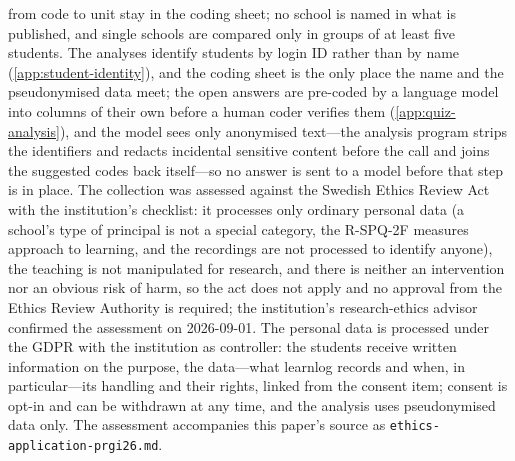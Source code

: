 from code to unit stay in the coding sheet; no school is named in what is
published, and single schools are compared only in groups of at least
five students.
The analyses identify students by login ID rather than by name
(\cref{app:student-identity}), and the coding sheet is the only place the
name and the pseudonymised data meet; the open answers are pre-coded by a
language model into columns of their own before a human coder verifies
them (\cref{app:quiz-analysis}), and the model sees only anonymised
text---the analysis program strips the identifiers and redacts
incidental sensitive content before the call and joins the suggested
codes back itself---so no answer is sent to a model before that step is
in place.
The collection was assessed against the Swedish Ethics Review Act
\autocite{Etikprovningslagen} with the institution's checklist: it
processes only ordinary personal data (a school's type of principal is
not a special category, the R-SPQ-2F measures approach to learning, and
the recordings are not processed to identify anyone), the teaching is
not manipulated for research, and there is neither an intervention nor
an obvious risk of harm, so the act does not apply and no approval from
the Ethics Review Authority is required; the institution's
research-ethics advisor confirmed the assessment on 2026-09-01.
The personal data is processed under the GDPR with the institution as
controller: the students receive written information on the purpose,
the data---what learnlog records and when, in particular---its handling
and their rights, linked from the consent item; consent is opt-in and
can be withdrawn at any time, and the analysis uses pseudonymised data
only.
The assessment accompanies this paper's source as
\texttt{ethics-application-prgi26.md}.

